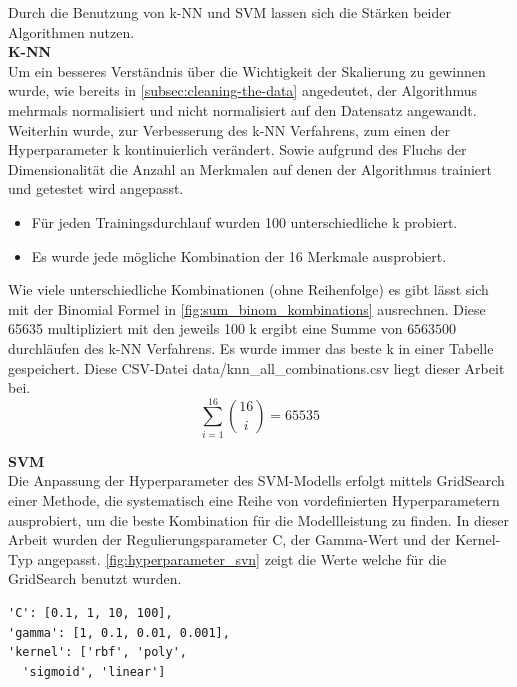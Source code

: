 Durch die Benutzung von k-NN und SVM lassen sich die Stärken beider Algorithmen nutzen.\\

\textbf{K-NN}\\
Um ein besseres Verständnis über die Wichtigkeit der Skalierung zu gewinnen wurde, wie bereits in \autoref{subsec:cleaning-the-data} angedeutet, der Algorithmus mehrmals normalisiert und nicht normalisiert auf den Datensatz angewandt.
Weiterhin wurde, zur Verbesserung des k-NN Verfahrens, zum einen der Hyperparameter \glqq{}k\grqq{} kontinuierlich verändert.
Sowie aufgrund des \glqq{}Fluchs der Dimensionalität\grqq{} die Anzahl an Merkmalen auf denen der Algorithmus trainiert und getestet wird angepasst.

\begin{itemize}[itemsep=0pt, parsep=0pt]
	\item Für jeden Trainingsdurchlauf wurden 100 unterschiedliche \glqq{}k\grqq{} probiert.
	\item Es wurde jede mögliche Kombination der 16 Merkmale ausprobiert.
\end{itemize}
 
Wie viele unterschiedliche Kombinationen (ohne Reihenfolge) es gibt lässt sich mit der Binomial Formel in \autoref{fig:sum_binom_kombinations} ausrechnen.
Diese 65635 multipliziert mit den jeweils 100 k ergibt eine Summe von $6563500$ durchläufen des k-NN Verfahrens.
Es wurde immer das beste \glqq{}k\grqq{} in einer Tabelle gespeichert. Diese CSV-Datei \glqq{}data/knn\_all\_combinations.csv\grqq{} liegt dieser Arbeit bei.
\vspace{-10pt}
$$
\sum_{i=1}^{16} \binom{16}{i} = 65535
$$
\label{fig:sum_binom_kombinations}

\textbf{SVM}\\
Die Anpassung der Hyperparameter des SVM-Modells erfolgt mittels \glqq{}GridSearch\grqq{} einer Methode, die systematisch eine Reihe von vordefinierten Hyperparametern ausprobiert, um die beste Kombination für die Modellleistung zu finden.
In dieser Arbeit wurden der Regulierungsparameter \glqq{}C\grqq{}, der \glqq{}Gamma\grqq{}-Wert und der \glqq{}Kernel\grqq{}-Typ angepasst.
\autoref{fig:hyperparameter_svn} zeigt die Werte welche für die \glqq{}GridSearch\grqq{} benutzt wurden. 

\begin{verbatim}
'C': [0.1, 1, 10, 100],
'gamma': [1, 0.1, 0.01, 0.001],
'kernel': ['rbf', 'poly', 
  'sigmoid', 'linear']
\end{verbatim}
\label{fig:hyperparameter_svn}


